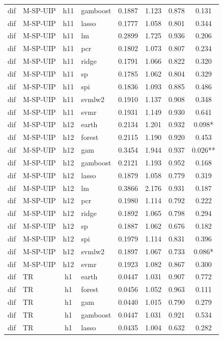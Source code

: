 \begin{ThreePartTable}
\begin{longtable}[t]{llclcccc}
dif & M-SP-UIP & h11 & gamboost & 0.1887 & 1.123 & 0.878 & 0.131\\
dif & M-SP-UIP & h11 & lasso & 0.1777 & 1.058 & 0.801 & 0.344\\
dif & M-SP-UIP & h11 & lm & 0.2899 & 1.725 & 0.936 & 0.206\\
dif & M-SP-UIP & h11 & pcr & 0.1802 & 1.073 & 0.807 & 0.234\\
dif & M-SP-UIP & h11 & ridge & 0.1791 & 1.066 & 0.822 & 0.320\\
dif & M-SP-UIP & h11 & sp & 0.1785 & 1.062 & 0.804 & 0.329\\
dif & M-SP-UIP & h11 & spi & 0.1836 & 1.093 & 0.885 & 0.486\\
dif & M-SP-UIP & h11 & svmlw2 & 0.1910 & 1.137 & 0.908 & 0.348\\
dif & M-SP-UIP & h11 & svmr & 0.1931 & 1.149 & 0.930 & 0.641\\
\addlinespace
dif & M-SP-UIP & h12 & earth & 0.2134 & 1.201 & 0.932 & 0.098*\\
dif & M-SP-UIP & h12 & forest & 0.2115 & 1.190 & 0.920 & 0.453\\
dif & M-SP-UIP & h12 & gam & 0.3454 & 1.944 & 0.937 & 0.026**\\
dif & M-SP-UIP & h12 & gamboost & 0.2121 & 1.193 & 0.952 & 0.168\\
dif & M-SP-UIP & h12 & lasso & 0.1879 & 1.058 & 0.779 & 0.319\\
dif & M-SP-UIP & h12 & lm & 0.3866 & 2.176 & 0.931 & 0.187\\
dif & M-SP-UIP & h12 & pcr & 0.1980 & 1.114 & 0.792 & 0.222\\
dif & M-SP-UIP & h12 & ridge & 0.1892 & 1.065 & 0.798 & 0.294\\
dif & M-SP-UIP & h12 & sp & 0.1887 & 1.062 & 0.676 & 0.182\\
dif & M-SP-UIP & h12 & spi & 0.1979 & 1.114 & 0.831 & 0.396\\
dif & M-SP-UIP & h12 & svmlw2 & 0.1897 & 1.067 & 0.733 & 0.086*\\
dif & M-SP-UIP & h12 & svmr & 0.1923 & 1.082 & 0.867 & 0.300\\
\addlinespace
dif & TR & h1 & earth & 0.0447 & 1.031 & 0.907 & 0.772\\
dif & TR & h1 & forest & 0.0456 & 1.052 & 0.963 & 0.111\\
dif & TR & h1 & gam & 0.0440 & 1.015 & 0.790 & 0.279\\
dif & TR & h1 & gamboost & 0.0447 & 1.031 & 0.921 & 0.534\\
dif & TR & h1 & lasso & 0.0435 & 1.004 & 0.632 & 0.282\\

\end{longtable}
\end{ThreePartTable}
